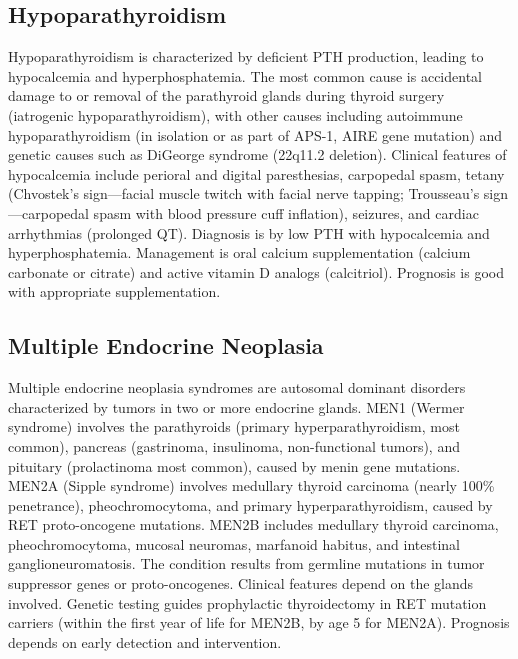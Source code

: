 \subsection{Hypoparathyroidism}
\label{sec:Hypoparathyroidism}
Hypoparathyroidism is characterized by deficient PTH production, leading to hypocalcemia and hyperphosphatemia. The most common cause is accidental damage to or removal of the parathyroid glands during thyroid surgery (iatrogenic hypoparathyroidism), with other causes including autoimmune hypoparathyroidism (in isolation or as part of APS-1, AIRE gene mutation) and genetic causes such as DiGeorge syndrome (22q11.2 deletion). Clinical features of hypocalcemia include perioral and digital paresthesias, carpopedal spasm, tetany (Chvostek's sign---facial muscle twitch with facial nerve tapping; Trousseau's sign---carpopedal spasm with blood pressure cuff inflation), seizures, and cardiac arrhythmias (prolonged QT). Diagnosis is by low PTH with hypocalcemia and hyperphosphatemia. Management is oral calcium supplementation (calcium carbonate or citrate) and active vitamin D analogs (calcitriol). Prognosis is good with appropriate supplementation.

\subsection{Multiple Endocrine Neoplasia}
\label{sec:Multiple Endocrine Neoplasia}
Multiple endocrine neoplasia syndromes are autosomal dominant disorders characterized by tumors in two or more endocrine glands. MEN1 (Wermer syndrome) involves the parathyroids (primary hyperparathyroidism, most common), pancreas (gastrinoma, insulinoma, non-functional tumors), and pituitary (prolactinoma most common), caused by menin gene mutations. MEN2A (Sipple syndrome) involves medullary thyroid carcinoma (nearly 100\% penetrance), pheochromocytoma, and primary hyperparathyroidism, caused by RET proto-oncogene mutations. MEN2B includes medullary thyroid carcinoma, pheochromocytoma, mucosal neuromas, marfanoid habitus, and intestinal ganglioneuromatosis. The condition results from germline mutations in tumor suppressor genes or proto-oncogenes. Clinical features depend on the glands involved. Genetic testing guides prophylactic thyroidectomy in RET mutation carriers (within the first year of life for MEN2B, by age 5 for MEN2A). Prognosis depends on early detection and intervention.

